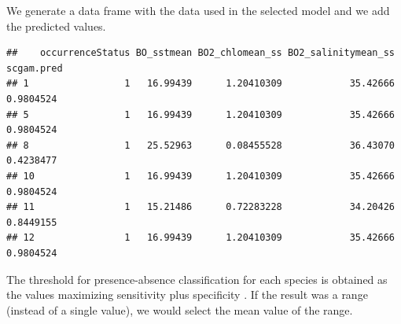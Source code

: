 \documentclass[
]{book}
\newenvironment{Shaded}{\begin{snugshade}}{\end{snugshade}}
\newcommand{\AttributeTok}[1]{\textcolor[rgb]{0.13,0.29,0.53}{#1}}
\newcommand{\CommentTok}[1]{\textcolor[rgb]{0.56,0.35,0.01}{\textit{#1}}}
\newcommand{\FunctionTok}[1]{\textcolor[rgb]{0.13,0.29,0.53}{\textbf{#1}}}
\newcommand{\NormalTok}[1]{#1}
\newcommand{\OtherTok}[1]{\textcolor[rgb]{0.56,0.35,0.01}{#1}}
\newcommand{\SpecialCharTok}[1]{\textcolor[rgb]{0.81,0.36,0.00}{\textbf{#1}}}
\newcommand{\StringTok}[1]{\textcolor[rgb]{0.31,0.60,0.02}{#1}}
\begin{document}
We generate a data frame with the data used in the selected model and we add the predicted values.

\begin{Shaded}
\end{Shaded}

\begin{verbatim}
##    occurrenceStatus BO_sstmean BO2_chlomean_ss BO2_salinitymean_ss scgam.pred
## 1                 1   16.99439      1.20410309            35.42666  0.9804524
## 5                 1   16.99439      1.20410309            35.42666  0.9804524
## 8                 1   25.52963      0.08455528            36.43070  0.4238477
## 10                1   16.99439      1.20410309            35.42666  0.9804524
## 11                1   15.21486      0.72283228            34.20426  0.8449155
## 12                1   16.99439      1.20410309            35.42666  0.9804524
\end{verbatim}

The threshold for presence-absence classification for each species is obtained as the values maximizing sensitivity plus specificity \citep{jimenez_etal_2007}. If the result was a range (instead of a single value), we would select the mean value of the range.

\begin{Shaded}
\end{Shaded}
\end{document}
